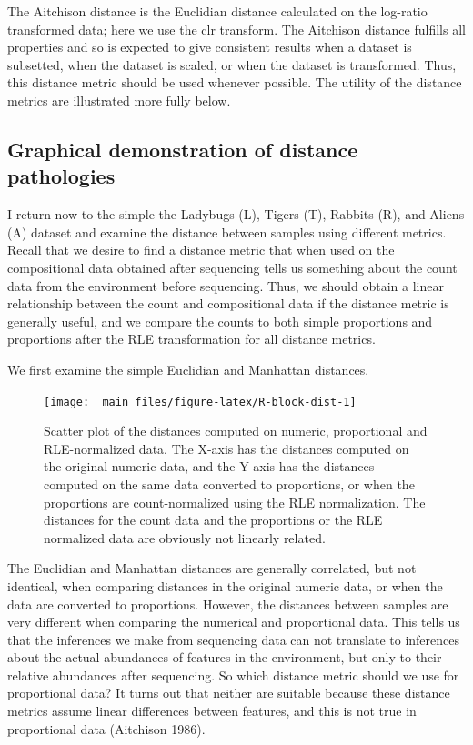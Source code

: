 \documentclass[onecolumn]{article}
\begin{document}
The Aitchison distance is the Euclidian distance calculated on the log-ratio transformed data; here we use the clr transform. The Aitchison distance fulfills all properties and so is expected to give consistent results when a dataset is subsetted, when the dataset is scaled, or when the dataset is transformed. Thus, this distance metric should be used whenever possible. The utility of the distance metrics are illustrated more fully below.

\hypertarget{graphical-demonstration-of-distance-pathologies}{%
\subsection{Graphical demonstration of distance pathologies}\label{graphical-demonstration-of-distance-pathologies}}

I return now to the simple the Ladybugs (L), Tigers (T), Rabbits (R), and Aliens (A) dataset and examine the distance between samples using different metrics. Recall that we desire to find a distance metric that when used on the compositional data obtained after sequencing tells us something about the count data from the environment before sequencing. Thus, we should obtain a linear relationship between the count and compositional data if the distance metric is generally useful, and we compare the counts to both simple proportions and proportions after the RLE transformation for all distance metrics.

We first examine the simple Euclidian and Manhattan distances.

\begin{figure}

{\centering \texttt{[image: \_main\_files/figure-latex/R-block-dist-1]} 

}

\caption{Scatter plot of the distances computed on numeric, proportional and RLE-normalized data. The X-axis has the distances computed on the original numeric data, and the Y-axis has the distances computed on the same data converted to proportions, or when the proportions are count-normalized using the RLE normalization. The distances for the count data and the proportions or the RLE normalized data are obviously not linearly related.}\label{fig:R-block-dist}
\end{figure}

The Euclidian and Manhattan distances are generally correlated, but not identical, when comparing distances in the original numeric data, or when the data are converted to proportions. However, the distances between samples are very different when comparing the numerical and proportional data. This tells us that the inferences we make from sequencing data can not translate to inferences about the actual abundances of features in the environment, but only to their relative abundances after sequencing. So which distance metric should we use for proportional data? It turns out that neither are suitable because these distance metrics assume linear differences between features, and this is not true in proportional data (Aitchison 1986).
\end{document}
